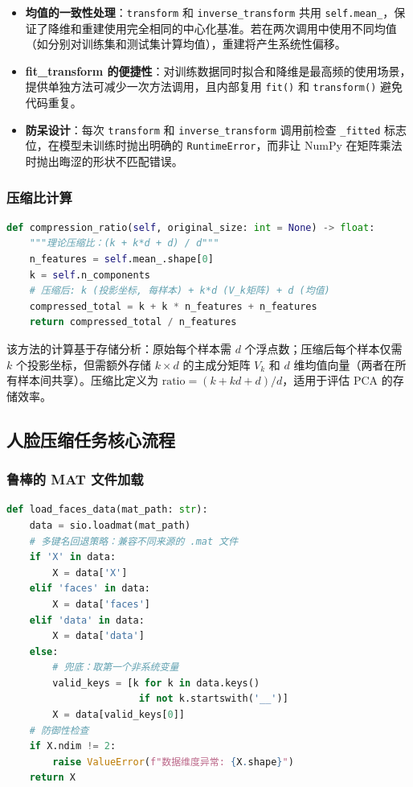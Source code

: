 \documentclass[a4paper]{article}
\begin{document}
\begin{itemize}
    \item \textbf{均值的一致性处理}：\texttt{transform} 和 \texttt{inverse\_transform} 共用 \texttt{self.mean\_}，保证了降维和重建使用完全相同的中心化基准。若在两次调用中使用不同均值（如分别对训练集和测试集计算均值），重建将产生系统性偏移。
    \item \textbf{fit\_transform 的便捷性}：对训练数据同时拟合和降维是最高频的使用场景，提供单独方法可减少一次方法调用，且内部复用 \texttt{fit()} 和 \texttt{transform()} 避免代码重复。
    \item \textbf{防呆设计}：每次 \texttt{transform} 和 \texttt{inverse\_transform} 调用前检查 \texttt{\_fitted} 标志位，在模型未训练时抛出明确的 \texttt{RuntimeError}，而非让 NumPy 在矩阵乘法时抛出晦涩的形状不匹配错误。
\end{itemize}

\subsubsection{压缩比计算}

\begin{lstlisting}[language=Python, caption=PCA.compression_ratio()]
def compression_ratio(self, original_size: int = None) -> float:
    """理论压缩比：(k + k*d + d) / d"""
    n_features = self.mean_.shape[0]
    k = self.n_components
    # 压缩后: k (投影坐标, 每样本) + k*d (V_k矩阵) + d (均值)
    compressed_total = k + k * n_features + n_features
    return compressed_total / n_features
\end{lstlisting}

该方法的计算基于存储分析：原始每个样本需 $d$ 个浮点数；压缩后每个样本仅需 $k$ 个投影坐标，但需额外存储 $k \times d$ 的主成分矩阵 $V_k$ 和 $d$ 维均值向量（两者在所有样本间共享）。压缩比定义为 $\text{ratio} = (k + kd + d)/d$，适用于评估 PCA 的存储效率。

\subsection{人脸压缩任务核心流程}

\subsubsection{鲁棒的 MAT 文件加载}

\begin{lstlisting}[language=Python, caption=face_task.py——健壮的.mat数据加载]
def load_faces_data(mat_path: str):
    data = sio.loadmat(mat_path)
    # 多键名回退策略：兼容不同来源的 .mat 文件
    if 'X' in data:
        X = data['X']
    elif 'faces' in data:
        X = data['faces']
    elif 'data' in data:
        X = data['data']
    else:
        # 兜底：取第一个非系统变量
        valid_keys = [k for k in data.keys()
                       if not k.startswith('__')]
        X = data[valid_keys[0]]
    # 防御性检查
    if X.ndim != 2:
        raise ValueError(f"数据维度异常: {X.shape}")
    return X
\end{lstlisting}
\end{document}
